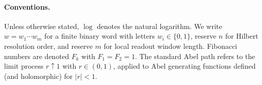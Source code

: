 \paragraph{Conventions.}
Unless otherwise stated, $\log$ denotes the natural logarithm.
We write $w=w_1\cdots w_m$ for a finite binary word with letters $w_i\in\{0,1\}$, reserve $n$ for Hilbert resolution order, and reserve $m$ for local readout window length.
Fibonacci numbers are denoted $F_k$ with $F_1=F_2=1$.
The standard Abel path refers to the limit process $r\uparrow 1$ with $r\in(0,1)$, applied to Abel generating functions defined (and holomorphic) for $|r|<1$.

\tableofcontents
\newpage


